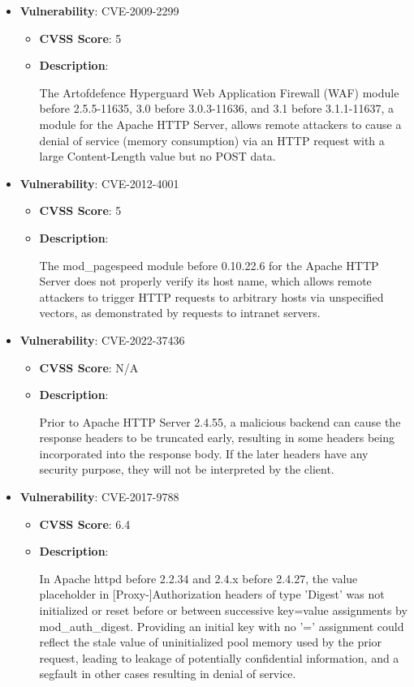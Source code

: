 \documentclass{article}
\begin{document}
\begin{itemize}
        \item \textbf{Vulnerability}: CVE-2009-2299
        \begin{itemize}
            \item \textbf{CVSS Score}:  5 
            \item \textbf{Description}:
            \parbox[t]{0.9\linewidth}{
                \ttfamily The Artofdefence Hyperguard Web Application Firewall (WAF) module before 2.5.5-11635, 3.0 before 3.0.3-11636, and 3.1 before 3.1.1-11637, a module for the Apache HTTP Server, allows remote attackers to cause a denial of service (memory consumption) via an HTTP request with a large Content-Length value but no POST data.
            }
        \end{itemize}
    
        \item \textbf{Vulnerability}: CVE-2012-4001
        \begin{itemize}
            \item \textbf{CVSS Score}:  5 
            \item \textbf{Description}:
            \parbox[t]{0.9\linewidth}{
                \ttfamily The mod\_pagespeed module before 0.10.22.6 for the Apache HTTP Server does not properly verify its host name, which allows remote attackers to trigger HTTP requests to arbitrary hosts via unspecified vectors, as demonstrated by requests to intranet servers.
            }
        \end{itemize}
    
        \item \textbf{Vulnerability}: CVE-2022-37436
        \begin{itemize}
            \item \textbf{CVSS Score}:  N/A 
            \item \textbf{Description}:
            \parbox[t]{0.9\linewidth}{
                \ttfamily Prior to Apache HTTP Server 2.4.55, a malicious backend can cause the response headers to be truncated early, resulting in some headers being incorporated into the response body. If the later headers have any security purpose, they will not be interpreted by the client.
            }
        \end{itemize}
    
        \item \textbf{Vulnerability}: CVE-2017-9788
        \begin{itemize}
            \item \textbf{CVSS Score}:  6.4 
            \item \textbf{Description}:
            \parbox[t]{0.9\linewidth}{
                \ttfamily In Apache httpd before 2.2.34 and 2.4.x before 2.4.27, the value placeholder in [Proxy-]Authorization headers of type 'Digest' was not initialized or reset before or between successive key=value assignments by mod\_auth\_digest. Providing an initial key with no '=' assignment could reflect the stale value of uninitialized pool memory used by the prior request, leading to leakage of potentially confidential information, and a segfault in other cases resulting in denial of service.
            }
        \end{itemize}
    

\end{itemize}
\end{document}
